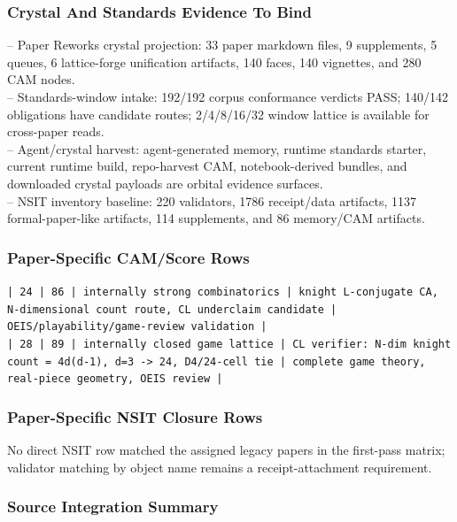 \documentclass[11pt]{article}
\begin{document}
\subsubsection*{Crystal And Standards Evidence To Bind}

\noindent{}-- Paper Reworks crystal projection: 33 paper markdown files, 9 supplements, 5 queues, 6 lattice-forge unification artifacts, 140 faces, 140 vignettes, and 280 CAM nodes.\\
\noindent{}-- Standards-window intake: 192/192 corpus conformance verdicts PASS; 140/142 obligations have candidate routes; 2/4/8/16/32 window lattice is available for cross-paper reads.\\
\noindent{}-- Agent/crystal harvest: agent-generated memory, runtime standards starter, current runtime build, repo-harvest CAM, notebook-derived bundles, and downloaded crystal payloads are orbital evidence surfaces.\\
\noindent{}-- NSIT inventory baseline: 220 validators, 1786 receipt/data artifacts, 1137 formal-paper-like artifacts, 114 supplements, and 86 memory/CAM artifacts.\\

\subsubsection*{Paper-Specific CAM/Score Rows}

\noindent\texttt{| 24 | 86 | internally strong combinatorics | knight L-conjugate CA, N-dimensional count route, CL underclaim candidate | OEIS/playability/game-review validation |}\\
\noindent\texttt{| 28 | 89 | internally closed game lattice | CL verifier: N-dim knight count = 4d(d-1), d=3 -> 24, D4/24-cell tie | complete game theory, real-piece geometry, OEIS review |}\\

\subsubsection*{Paper-Specific NSIT Closure Rows}

No direct NSIT row matched the assigned legacy papers in the first-pass matrix; validator matching by object name remains a receipt-attachment requirement.

\subsubsection*{Source Integration Summary}
\end{document}
